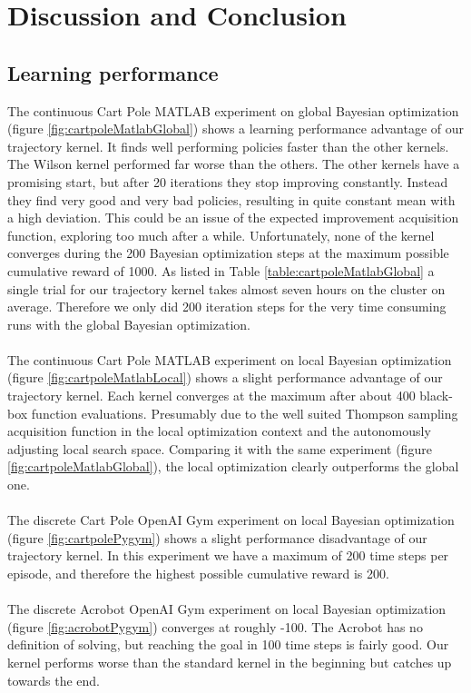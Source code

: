 \chapter{Discussion and Conclusion}
\label{chap:6}

\section{Learning performance}
The continuous Cart Pole MATLAB experiment on global Bayesian optimization (figure \ref{fig:cartpoleMatlabGlobal}) shows a learning performance advantage of our trajectory kernel. It finds well performing policies faster than the other kernels. The Wilson kernel performed far worse than the others. The other kernels have a promising start, but after 20 iterations they stop improving constantly. Instead they find very good and very bad policies, resulting in quite constant mean with a high deviation. This could be an issue of the expected improvement acquisition function, exploring too much after a while. Unfortunately, none of the kernel converges during the 200 Bayesian optimization steps at the maximum possible cumulative reward of 1000. As listed in Table \ref{table:cartpoleMatlabGlobal} a single trial for our trajectory kernel takes almost seven hours on the cluster on average. Therefore we only did 200 iteration steps for the very time consuming runs with the global Bayesian optimization.\\
\\
The continuous Cart Pole MATLAB experiment on local Bayesian optimization (figure \ref{fig:cartpoleMatlabLocal}) shows a slight performance advantage of our trajectory kernel. Each kernel converges at the maximum after about 400 black-box function evaluations. Presumably due to the well suited Thompson sampling acquisition function in the local optimization context and the autonomously adjusting local search space. Comparing it with the same experiment (figure \ref{fig:cartpoleMatlabGlobal}), the local optimization clearly outperforms the global one.\\
\\
The discrete Cart Pole OpenAI Gym experiment on local Bayesian optimization (figure \ref{fig:cartpolePygym}) shows a slight performance disadvantage of our trajectory kernel. In this experiment we have a maximum of 200 time steps per episode, and therefore the highest possible cumulative reward is 200.\\
\\
The discrete Acrobot OpenAI Gym experiment on local Bayesian optimization (figure \ref{fig:acrobotPygym}) converges at roughly -100. The Acrobot has no definition of solving, but reaching the goal in 100 time steps is fairly good. Our kernel performs worse than the standard kernel in the beginning but catches up towards the end.\\
